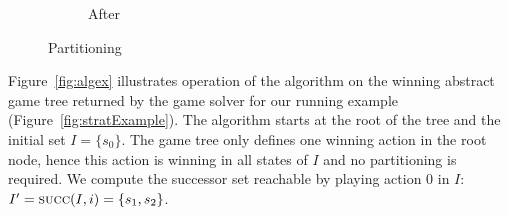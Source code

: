 \begin{figure}[b]
\begin{subfigure}[t]{.3\textwidth}
\begin{minipage}[t][3cm][t]{\textwidth}
        \end{minipage}
        \caption{After}
    \end{subfigure}%
    \hspace*{\fill}
    \caption{Partitioning}
    \label{fig:partition}
\end{figure}

Figure~\ref{fig:algex} illustrates operation of the algorithm on the winning abstract game tree returned by the game solver for our running example (Figure~\ref{fig:stratExample}).  The algorithm starts at the root of the tree and the initial set $I=\{s_0\}$.  The game tree only defines one winning action in the root node, hence this action is winning in all states of $I$ and no partitioning is required.  We compute the successor set reachable by playing action $0$ in $I$: $I' = \textsc{succ}(I, i) = \{s_1, s_2\}$.


